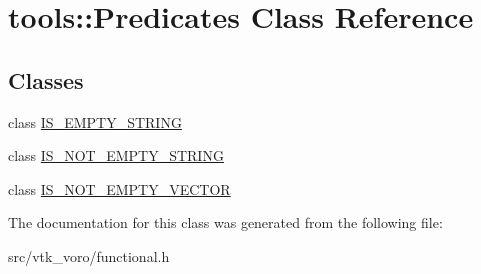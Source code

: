\hypertarget{classtools_1_1Predicates}{}\section{tools\+:\+:Predicates Class Reference}
\label{classtools_1_1Predicates}
\subsection*{Classes}
\begin{DoxyCompactItemize}
\item 
class \hyperlink{classtools_1_1Predicates_1_1IS__EMPTY__STRING}{I\+S\+\_\+\+E\+M\+P\+T\+Y\+\_\+\+S\+T\+R\+I\+NG}
\item 
class \hyperlink{classtools_1_1Predicates_1_1IS__NOT__EMPTY__STRING}{I\+S\+\_\+\+N\+O\+T\+\_\+\+E\+M\+P\+T\+Y\+\_\+\+S\+T\+R\+I\+NG}
\item 
class \hyperlink{classtools_1_1Predicates_1_1IS__NOT__EMPTY__VECTOR}{I\+S\+\_\+\+N\+O\+T\+\_\+\+E\+M\+P\+T\+Y\+\_\+\+V\+E\+C\+T\+OR}
\end{DoxyCompactItemize}


The documentation for this class was generated from the following file\+:\begin{DoxyCompactItemize}
\item 
src/vtk\+\_\+voro/functional.\+h\end{DoxyCompactItemize}
